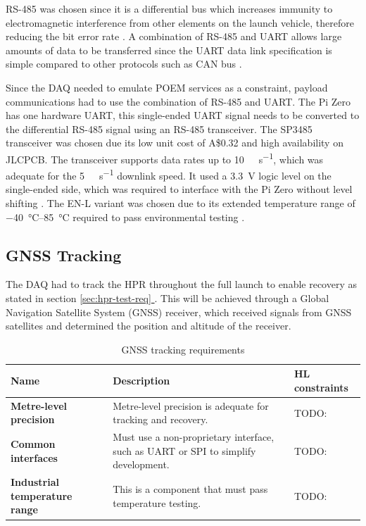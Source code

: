 \documentclass{report}
\newcommand*{\secref}[1]{section \hyperref[{#1}]{\ref*{#1} \nameref*{#1}}}
\newcommand{\aud}{A\$}
\begin{document}
RS-485 was chosen since it is a differential bus which increases immunity to electromagnetic interference from other elements on the launch vehicle, therefore reducing the bit error rate \cite{cratere2024board}. A combination of RS-485 and UART allows large amounts of data to be transferred since the UART data link specification is simple compared to other protocols such as CAN bus \cite{cratere2024board}.

Since the DAQ needed to emulate POEM services as a constraint, payload communications had to use the combination of RS-485 and UART. The Pi Zero has one hardware UART, this single-ended UART signal needs to be converted to the differential RS-485 signal using an RS-485 transceiver. The SP3485 transceiver was chosen due its low unit cost of \aud 0.32 and high availability on JLCPCB. The transceiver supports data rates up to \SI{10}{\mega\bit\per\second}, which was adequate for the \SI{5}{\kilo\bit\per\second} downlink speed. It used a \SI{3.3}{\volt} logic level on the single-ended side, which was required to interface with the Pi Zero without level shifting \cite{maxlinear2021sp3485}. The EN-L variant was chosen due to its extended temperature range of \SIrange{-40}{85}{\degreeCelsius} required to pass environmental testing \cite{maxlinear2021sp3485}.

\subsection{GNSS Tracking}

The DAQ had to track the HPR throughout the full launch to enable recovery as stated in \secref{sec:hpr-test-req}. This will be achieved through a Global Navigation Satellite System (GNSS) receiver, which received signals from GNSS satellites and determined the position and altitude of the receiver.


\begin{table}[H]
  \centering
  \begin{tabular}{|L{0.2\textwidth}|L{0.495\textwidth}|L{0.2\textwidth}|}
    \hline
    \textbf{Name}                         & \textbf{Description}                                                               & \textbf{HL constraints} \\ \hline
    \textbf{Metre-level precision}        & Metre-level precision is adequate for tracking and recovery.                       & TODO:                   \\\hline
    \textbf{Common interfaces}            & Must use a non-proprietary interface, such as UART or SPI to simplify development. & TODO:                   \\\hline
    \textbf{Industrial temperature range} & This is a component that must pass temperature testing.                            & TODO:                   \\\hline
  \end{tabular}
  \caption{GNSS tracking requirements}
  \label{tabl:gnss-requirements}
\end{table}
\end{document}
